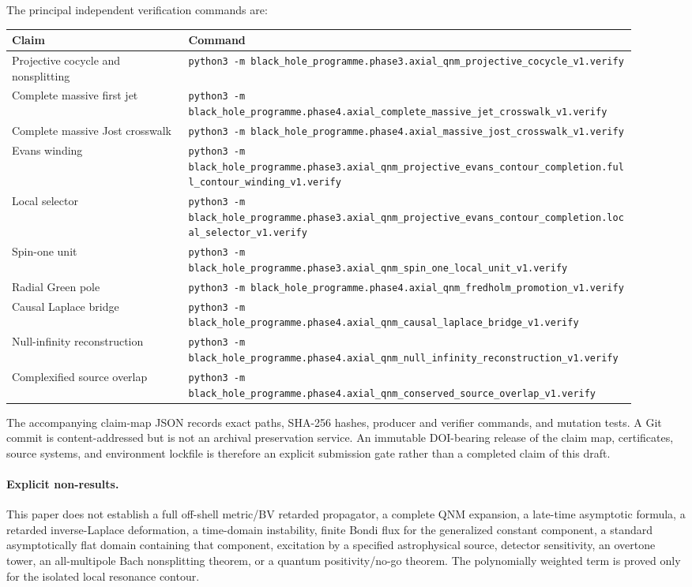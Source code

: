 \documentclass[11pt]{article}
\theoremstyle{remark}
\begin{document}
The principal independent verification commands are:
\begin{center}
\scriptsize
\begin{tabular}{p{0.26\linewidth}p{0.66\linewidth}}
\toprule
Claim & Command\\
\midrule
Projective cocycle and nonsplitting
& \nolinkurl{python3 -m black_hole_programme.phase3.axial_qnm_projective_cocycle_v1.verify}\\
Complete massive first jet
& \nolinkurl{python3 -m black_hole_programme.phase4.axial_complete_massive_jet_crosswalk_v1.verify}\\
Complete massive Jost crosswalk
& \nolinkurl{python3 -m black_hole_programme.phase4.axial_massive_jost_crosswalk_v1.verify}\\
Evans winding
& \nolinkurl{python3 -m black_hole_programme.phase3.axial_qnm_projective_evans_contour_completion.full_contour_winding_v1.verify}\\
Local selector
& \nolinkurl{python3 -m black_hole_programme.phase3.axial_qnm_projective_evans_contour_completion.local_selector_v1.verify}\\
Spin-one unit
& \nolinkurl{python3 -m black_hole_programme.phase3.axial_qnm_spin_one_local_unit_v1.verify}\\
Radial Green pole
& \nolinkurl{python3 -m black_hole_programme.phase4.axial_qnm_fredholm_promotion_v1.verify}\\
Causal Laplace bridge
& \nolinkurl{python3 -m black_hole_programme.phase4.axial_qnm_causal_laplace_bridge_v1.verify}\\
Null-infinity reconstruction
& \nolinkurl{python3 -m black_hole_programme.phase4.axial_qnm_null_infinity_reconstruction_v1.verify}\\
Complexified source overlap
& \nolinkurl{python3 -m black_hole_programme.phase4.axial_qnm_conserved_source_overlap_v1.verify}\\
\bottomrule
\end{tabular}
\end{center}
The accompanying claim-map JSON records exact paths, SHA-256 hashes,
producer and verifier commands, and mutation tests.  A Git commit is
content-addressed but is not an archival preservation service.  An
immutable DOI-bearing release of the claim map, certificates, source
systems, and environment lockfile is therefore an explicit submission
gate rather than a completed claim of this draft.

\paragraph{Explicit non-results.}
This paper does not establish a full off-shell metric/BV retarded
propagator, a complete QNM expansion, a late-time asymptotic formula, a
retarded inverse-Laplace deformation, a time-domain instability, finite Bondi flux
for the generalized constant component, a standard asymptotically flat
domain containing that component, excitation by a specified
astrophysical source, detector sensitivity, an overtone tower, an
all-multipole Bach nonsplitting theorem, or a quantum positivity/no-go
theorem.  The polynomially weighted term is proved only for the isolated
local resonance contour.
\end{document}
